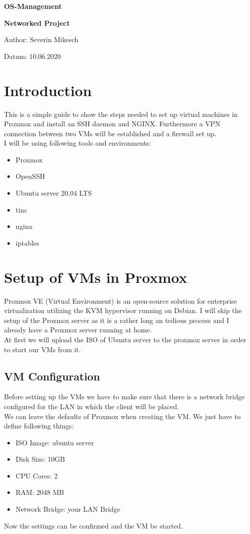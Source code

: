 \documentclass[10pt,a4paper]{article}
\begin{document}
\huge
\begin{center}
{\bf OS-Management}\par
{\bf Networked Project}\par
\vspace{5cm}
\end{center}

\large
Author: Severin Mikesch\par
\vspace{0.8cm}
Datum: 10.06.2020\par
\vspace{0.8cm}

\normalsize


\newpage
\section{Introduction}
This is a simple guide to show the steps needed to set up virtual machines in Proxmox and install an SSH daemon and NGINX. Furthermore a VPN connection between two VMs will be established and a firewall set up.
\\
I will be using following tools and environments:
\begin{itemize}
\item Proxmox
\item OpenSSH
\item Ubuntu server 20.04 LTS
\item tinc
\item nginx
\item iptables
\end{itemize}

\newpage
\section{Setup of VMs in Proxmox}
Proxmox VE (Virtual Environment) is an open-source solution for enterprise virtualization utilizing the KVM hypervisor running on Debian. I will skip the setup of the Proxmox server as it is a rather long an tedious process and I already have a Proxmox server running at home.
\\
At first we will upload the ISO of Ubuntu server to the proxmox server in order to start our VMs from it.

\subsection{VM Configuration}
Before setting up the VMs we have to make sure that there is a network bridge configured for the LAN in which the client will be placed.
\\
We can leave the defaults of Proxmox when creating the VM. We just have to define following things:
\begin{itemize}
\item ISO Image: ubuntu server
\item Disk Size: 10GB
\item CPU Cores: 2
\item RAM: 2048 MB
\item Network Bridge: your LAN Bridge
\end{itemize}
Now the settings can be confirmed and the VM be started.
\end{document}
